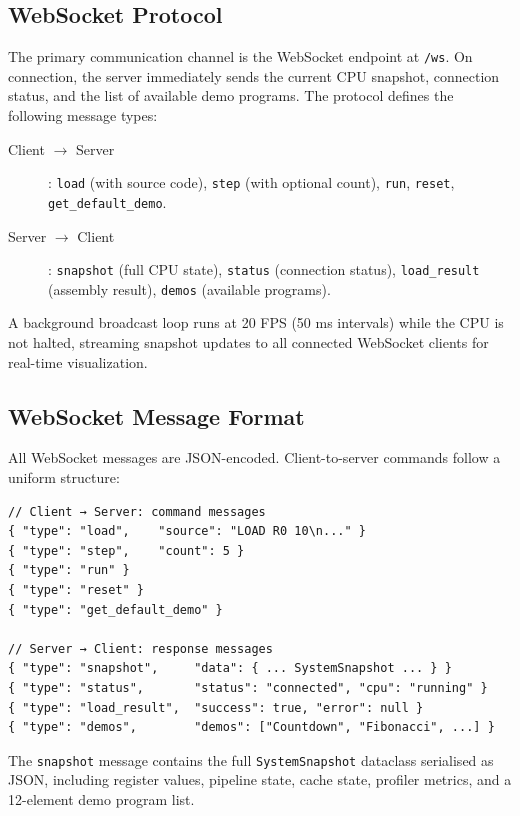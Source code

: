 \documentclass[10pt,a4paper,twoside]{book}
\begin{document}
\subsection{WebSocket Protocol}

The primary communication channel is the WebSocket endpoint at
\texttt{/ws}. On connection, the server immediately sends the current
CPU snapshot, connection status, and the list of available demo programs.
The protocol defines the following message types:

\begin{description}
    \item[Client $\rightarrow$ Server]:
          \texttt{load} (with source code), \texttt{step} (with optional
          count), \texttt{run}, \texttt{reset}, \texttt{get\_default\_demo}.
    \item[Server $\rightarrow$ Client]:
          \texttt{snapshot} (full CPU state), \texttt{status} (connection
          status), \texttt{load\_result} (assembly result),
          \texttt{demos} (available programs).
\end{description}

A background broadcast loop runs at 20 FPS (50 ms intervals) while the
CPU is not halted, streaming snapshot updates to all connected WebSocket
clients for real-time visualization.

\subsection{WebSocket Message Format}

All WebSocket messages are JSON-encoded. Client-to-server commands follow
a uniform structure:

\begin{verbatim}
// Client → Server: command messages
{ "type": "load",    "source": "LOAD R0 10\n..." }
{ "type": "step",    "count": 5 }
{ "type": "run" }
{ "type": "reset" }
{ "type": "get_default_demo" }

// Server → Client: response messages
{ "type": "snapshot",     "data": { ... SystemSnapshot ... } }
{ "type": "status",       "status": "connected", "cpu": "running" }
{ "type": "load_result",  "success": true, "error": null }
{ "type": "demos",        "demos": ["Countdown", "Fibonacci", ...] }
\end{verbatim}

The \texttt{snapshot} message contains the full \texttt{SystemSnapshot}
dataclass serialised as JSON, including register values, pipeline state,
cache state, profiler metrics, and a 12-element demo program list.
\end{document}
